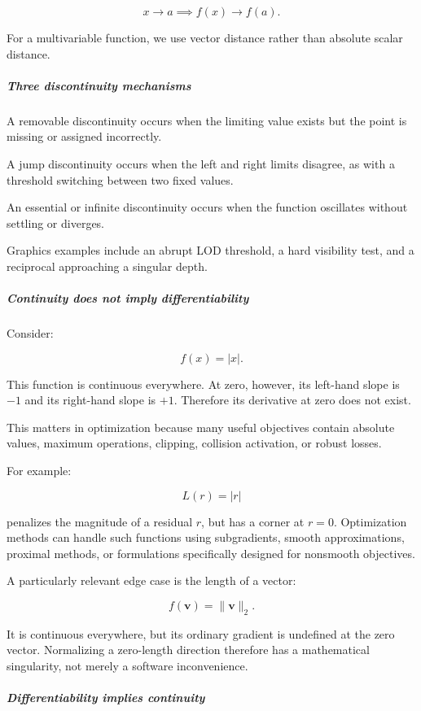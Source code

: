 \[
x\to a \implies f(x)\to f(a).
\]

For a multivariable function, we use vector distance rather than absolute scalar distance.

\subparagraph{Three discontinuity mechanisms}\label{01-foundations-i-ch020-three-discontinuity-mechanisms}

A removable discontinuity occurs when the limiting value exists but the point is missing or assigned incorrectly.

A jump discontinuity occurs when the left and right limits disagree, as with a threshold switching between two fixed values.

An essential or infinite discontinuity occurs when the function oscillates without settling or diverges.

Graphics examples include an abrupt LOD threshold, a hard visibility test, and a reciprocal approaching a singular depth.

\subparagraph{Continuity does not imply differentiability}\label{01-foundations-i-ch020-continuity-does-not-imply-differentiability}

Consider:

\[
f(x)=|x|.
\]

This function is continuous everywhere. At zero, however, its left-hand slope is \(-1\) and its right-hand slope is \(+1\). Therefore its derivative at zero does not exist.

This matters in optimization because many useful objectives contain absolute values, maximum operations, clipping, collision activation, or robust losses.

For example:

\[
L(r)=|r|
\]

penalizes the magnitude of a residual \(r\), but has a corner at \(r=0\). Optimization methods can handle such functions using subgradients, smooth approximations, proximal methods, or formulations specifically designed for nonsmooth objectives.

A particularly relevant edge case is the length of a vector:

\[
f(\mathbf v)=\|\mathbf v\|_2.
\]

It is continuous everywhere, but its ordinary gradient is undefined at the zero vector. Normalizing a zero-length direction therefore has a mathematical singularity, not merely a software inconvenience.

\subparagraph{Differentiability implies continuity}\label{01-foundations-i-ch020-differentiability-implies-continuity}

